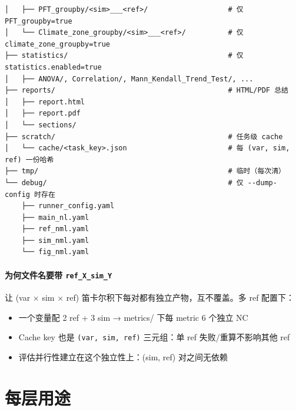 \begin{verbatim}
│   ├── PFT_groupby/<sim>___<ref>/                   # 仅 PFT_groupby=true
│   └── Climate_zone_groupby/<sim>___<ref>/          # 仅 climate_zone_groupby=true
├── statistics/                                      # 仅 statistics.enabled=true
│   ├── ANOVA/, Correlation/, Mann_Kendall_Trend_Test/, ...
├── reports/                                         # HTML/PDF 总结
│   ├── report.html
│   ├── report.pdf
│   └── sections/
├── scratch/                                         # 任务级 cache
│   └── cache/<task_key>.json                        # 每 (var, sim, ref) 一份哈希
├── tmp/                                             # 临时（每次清）
└── debug/                                           # 仅 --dump-config 时存在
    ├── runner_config.yaml
    ├── main_nl.yaml
    ├── ref_nml.yaml
    ├── sim_nml.yaml
    └── fig_nml.yaml
\end{verbatim}

\paragraph{为何文件名要带 \texttt{ref\_X\_sim\_Y}}

让 (var × sim × ref) 笛卡尔积下每对都有独立产物，互不覆盖。多 ref 配置下：

\begin{itemize}
  \item 一个变量配 2 ref + 3 sim → metrics/ 下每 metric 6 个独立 NC
  \item Cache key 也是 \texttt{(var, sim, ref)} 三元组：单 ref 失败/重算不影响其他 ref
  \item 评估并行性建立在这个独立性上：(sim, ref) 对之间无依赖
\end{itemize}

\section{每层用途}

